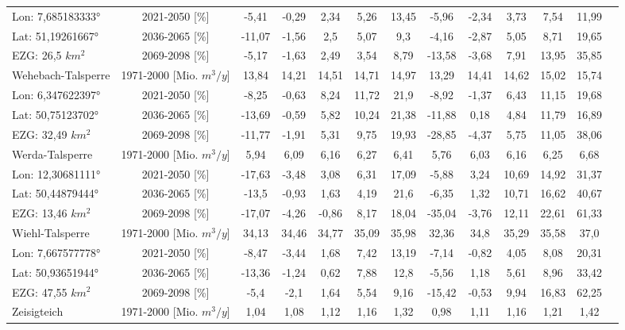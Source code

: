\begin{longtable}{@{\extracolsep{\fill}}lc|ccccc||cccccc}
\cline{2-13} 
Lon: 7,685183333° & 2021-2050 [\%]  & -5,41 & -0,29 & 2,34 & 5,26 & 13,45 & -5,96 & -2,34 & 3,73 & 7,54 & 11,99 & \\ 
Lat: 51,19261667° & 2036-2065 [\%]  & -11,07 & -1,56 & 2,5 & 5,07 & 9,3 & -4,16 & -2,87 & 5,05 & 8,71 & 19,65 & \\ 
EZG: 26,5 $km^2$ & 2069-2098 [\%]  & -5,17 & -1,63 & 2,49 & 3,54 & 8,79 & -13,58 & -3,68 & 7,91 & 13,95 & 35,85 & \\ 
\hline 
Wehebach-Talsperre & 1971-2000 [Mio. $m^3/y$]  & 13,84 & 14,21 & 14,51 & 14,71 & 14,97 & 13,29 & 14,41 & 14,62 & 15,02 & 15,74 & \\ 
\cline{2-13} 
Lon: 6,347622397° & 2021-2050 [\%]  & -8,25 & -0,63 & 8,24 & 11,72 & 21,9 & -8,92 & -1,37 & 6,43 & 11,15 & 19,68 & \\ 
Lat: 50,75123702° & 2036-2065 [\%]  & -13,69 & -0,59 & 5,82 & 10,24 & 21,38 & -11,88 & 0,18 & 4,84 & 11,79 & 16,89 & \\ 
EZG: 32,49 $km^2$ & 2069-2098 [\%]  & -11,77 & -1,91 & 5,31 & 9,75 & 19,93 & -28,85 & -4,37 & 5,75 & 11,05 & 38,06 & \\ 
\hline 
Werda-Talsperre & 1971-2000 [Mio. $m^3/y$]  & 5,94 & 6,09 & 6,16 & 6,27 & 6,41 & 5,76 & 6,03 & 6,16 & 6,25 & 6,68 & \\ 
\cline{2-13} 
Lon: 12,30681111° & 2021-2050 [\%]  & -17,63 & -3,48 & 3,08 & 6,31 & 17,09 & -5,88 & 3,24 & 10,69 & 14,92 & 31,37 & \\ 
Lat: 50,44879444° & 2036-2065 [\%]  & -13,5 & -0,93 & 1,63 & 4,19 & 21,6 & -6,35 & 1,32 & 10,71 & 16,62 & 40,67 & \\ 
EZG: 13,46 $km^2$ & 2069-2098 [\%]  & -17,07 & -4,26 & -0,86 & 8,17 & 18,04 & -35,04 & -3,76 & 12,11 & 22,61 & 61,33 & \\ 
\hline 
Wiehl-Talsperre & 1971-2000 [Mio. $m^3/y$]  & 34,13 & 34,46 & 34,77 & 35,09 & 35,98 & 32,36 & 34,8 & 35,29 & 35,58 & 37,0 & \\ 
\cline{2-13} 
Lon: 7,667577778° & 2021-2050 [\%]  & -8,47 & -3,44 & 1,68 & 7,42 & 13,19 & -7,14 & -0,82 & 4,05 & 8,08 & 20,31 & \\ 
Lat: 50,93651944° & 2036-2065 [\%]  & -13,36 & -1,24 & 0,62 & 7,88 & 12,8 & -5,56 & 1,18 & 5,61 & 8,96 & 33,42 & \\ 
EZG: 47,55 $km^2$ & 2069-2098 [\%]  & -5,4 & -2,1 & 1,64 & 5,54 & 9,16 & -15,42 & -0,53 & 9,94 & 16,83 & 62,25 & \\ 
\hline 
Zeisigteich & 1971-2000 [Mio. $m^3/y$]  & 1,04 & 1,08 & 1,12 & 1,16 & 1,32 & 0,98 & 1,11 & 1,16 & 1,21 & 1,42 & \\ 

\end{longtable}
